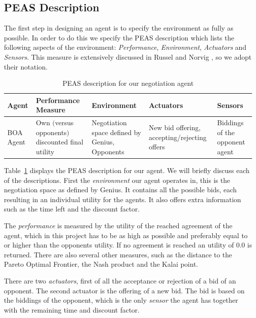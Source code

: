 \documentclass[a4paper,10pt]{article}
\begin{document}
\subsection{PEAS Description}

The first step in designing an agent is to specify the environment as fully as possible. In order to do this we specify the PEAS description which lists the following aspects of the environment: \emph{Performance}, \emph{Environment}, \emph{Actuators} and \emph{Sensors}. This measure is extensively discussed in Russel and Norvig \cite{russel-norvig}, so we adopt their notation.

\begin{table}[H]
  \small
    \begin{tabular}{|p{1.8cm}|p{3cm}|p{3cm}|p{3cm}|p{3cm}|}
    \hline
    \textbf{Agent} & \textbf{Performance \mbox{Measure}} & \textbf{Environment} & \textbf{Actuators} & \textbf{Sensors} \\
    \hline
    BOA Agent & Own $($versus opponents$)$ discounted final utility & Negotiation space defined by Genius, \mbox{Opponents} & New bid offering, \mbox{accepting/rejecting} offers & Biddings of the \mbox{opponent} agent \\
    \hline
    \end{tabular}
    
    \caption{PEAS description for our negotiation agent \label{table:peas-description}}
\end{table}

Table~\ref{table:peas-description} displays the PEAS description for our agent. We will briefly discuss each of the descriptions. First the \emph{environment} our agent operates in, this is the negotiation space as defined by Genius. It contains all the possible bids, each resulting in an individual utility for the agents. It also offers extra information such as the time left and the discount factor. 

The \emph{performance} is measured by the utility of the reached agreement of  the agent, which in this project has to be as high as possible and preferably equal to or higher than the opponents utility. If no agreement is reached an utility of $0.0$ is  returned.
There are also several other measures, such as the distance to the Pareto Optimal Frontier, the Nash product and the Kalai point.

There are two \emph{actuators}, first of all the acceptance or rejection of a bid of an opponent. The second actuator is the offering of a new bid. The bid is based on the biddings of the opponent, which is the only \emph{sensor} the agent has together with the remaining time 
and discount factor. 
\end{document}
